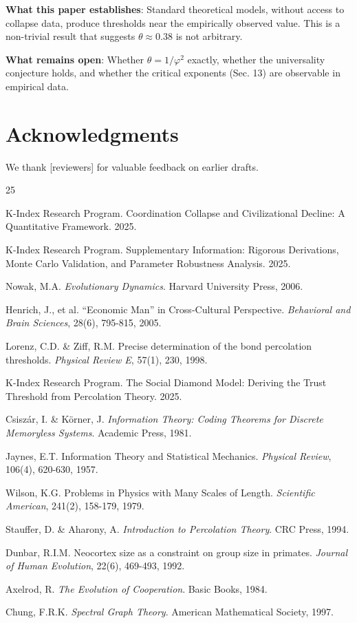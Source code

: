 \documentclass[11pt,twocolumn]{article}
\begin{document}
\textbf{What this paper establishes}: Standard theoretical models, without access to collapse data, produce thresholds near the empirically observed value. This is a non-trivial result that suggests $\theta \approx 0.38$ is not arbitrary.

\textbf{What remains open}: Whether $\theta = 1/\varphi^2$ exactly, whether the universality conjecture holds, and whether the critical exponents (Sec. 13) are observable in empirical data.

\section*{Acknowledgments}

We thank [reviewers] for valuable feedback on earlier drafts.

\begin{thebibliography}{25}

K-Index Research Program. Coordination Collapse and Civilizational Decline: A Quantitative Framework. 2025.

K-Index Research Program. Supplementary Information: Rigorous Derivations, Monte Carlo Validation, and Parameter Robustness Analysis. 2025.

Nowak, M.A. \textit{Evolutionary Dynamics}. Harvard University Press, 2006.

Henrich, J., et al. ``Economic Man'' in Cross-Cultural Perspective. \textit{Behavioral and Brain Sciences}, 28(6), 795-815, 2005.

Lorenz, C.D. \& Ziff, R.M. Precise determination of the bond percolation thresholds. \textit{Physical Review E}, 57(1), 230, 1998.

K-Index Research Program. The Social Diamond Model: Deriving the Trust Threshold from Percolation Theory. 2025.

Csiszár, I. \& Körner, J. \textit{Information Theory: Coding Theorems for Discrete Memoryless Systems}. Academic Press, 1981.

Jaynes, E.T. Information Theory and Statistical Mechanics. \textit{Physical Review}, 106(4), 620-630, 1957.

Wilson, K.G. Problems in Physics with Many Scales of Length. \textit{Scientific American}, 241(2), 158-179, 1979.

Stauffer, D. \& Aharony, A. \textit{Introduction to Percolation Theory}. CRC Press, 1994.

Dunbar, R.I.M. Neocortex size as a constraint on group size in primates. \textit{Journal of Human Evolution}, 22(6), 469-493, 1992.

Axelrod, R. \textit{The Evolution of Cooperation}. Basic Books, 1984.

Chung, F.R.K. \textit{Spectral Graph Theory}. American Mathematical Society, 1997.

\end{thebibliography}
\end{document}
